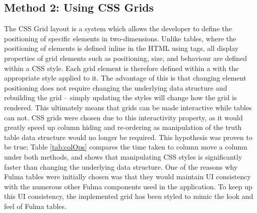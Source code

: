 \subsection{Method 2: Using CSS Grids}
The CSS Grid layout \cite{cssgrids} is a system which allows the developer to define the positioning of specific elements in two-dimensions. Unlike tables, where the positioning of elements is defined inline in the HTML using tags, all display properties of grid elements such as positioning, size, and behaviour are defined within a CSS style. Each grid element is therefore defined within a  with the appropriate style applied to it. The advantage of this is that changing element positioning does not require changing the underlying data structure and rebuilding the grid -- simply updating the styles will change how the grid is rendered. This ultimately means that grids can be made interactive while tables can not. CSS grids were chosen due to this interactivity property, as it would greatly speed up column hiding and re-ordering as manipulation of the truth table data structure would no longer be required. This hypothesis was proven to be true; Table \ref{tab:colOps} compares the time taken to column move a column under both methods, and shows that manipulating CSS styles is significantly faster than changing the underlying data structure. One of the reasons why Fulma tables were initially chosen was that they would maintain UI consistency with the numerous other Fulma components used in the application. To keep up this UI consistency, the implemented grid has been styled to mimic the look and feel of Fulma tables. 


